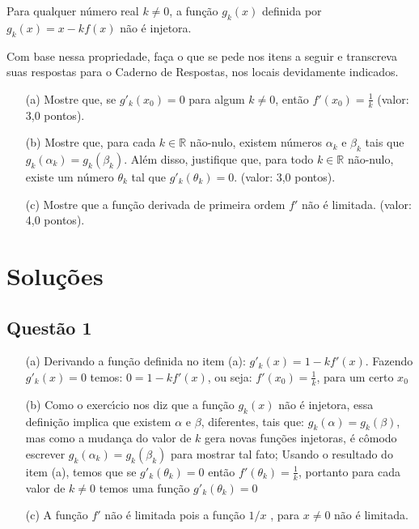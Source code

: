 \documentclass{report}
\begin{document}
Para qualquer n\'umero real $k\neq 0$, a fun\c c\~ao $g_k (x)$ definida por $g_k (x)=x-kf(x)$ n\~ao \'e injetora.

Com base nessa propriedade, fa\c ca o que se pede nos itens a seguir e transcreva suas respostas para o Caderno de Respostas, nos locais devidamente indicados.

\begin{enumerate}

\item[(a)] Mostre que, se $g'_k(x_0)=0$ para algum $k\neq 0$, ent\~ao $f' (x_0)=\frac1{k}$ (valor: 3,0 pontos).

\item[(b)] Mostre que, para cada $k \in \mathbb{R}$ n\~ao-nulo, existem n\'umeros $\alpha_k$ e $\beta_k$ tais que $g_k(\alpha_k) = g_k(\beta_k)$. Al\'em disso, justifique que, para todo $k \in \mathbb{R}$ n\~ao-nulo, existe um n\'umero $\theta_k$ tal que $g'_k(\theta_k)=0$. (valor: 3,0 pontos).

\item[(c)] Mostre que a fun\c c\~ao derivada de primeira ordem $f'$ n\~ao \'e limitada. (valor: 4,0 pontos).

\end{enumerate}

\section{\color{red} Solu\c c\~oes}

\subsection{\color{red} Quest\~ao 1}

\begin{enumerate}

\item[(a)] Derivando a fun\c c\~ao definida no item (a): $g'_k(x)=1-kf'(x)$. Fazendo $g'_k(x)=0$ temos: $0=1-kf'(x)$, ou seja: $f'(x_0)=\frac1{k}$, para um certo $x_0$

\item[(b)] Como o exerc\'\i cio nos diz que a fun\c c\~ao $g_k(x)$ n\~ao \'e injetora, essa defini\c c\~ao implica que existem $\alpha$ e $\beta$, diferentes, tais que: $g_k(\alpha)=g_k(\beta)$, mas como a mudan\c ca do valor de $k$ gera novas fun\c c\~oes injetoras, \'e cômodo escrever $g_k(\alpha_k)=g_k(\beta_k)$ para mostrar tal fato; Usando o resultado do item (a), temos que se $g'_k(\theta_k)=0$ ent\~ao $f'(\theta_k)=\frac1{k}$, portanto para cada valor de $k\neq 0$ temos uma fun\c c\~ao $g'_k(\theta_k)=0$

\item[(c)] A fun\c c\~ao $f'$ n\~ao \'e limitada pois a fun\c c\~ao $1/x$ , para $x \neq 0$ n\~ao \'e limitada.

\end{enumerate}
\end{document}
